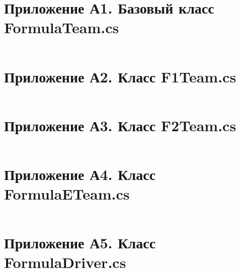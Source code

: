 \documentclass[oneside,a4paper,14pt]{extarticle}
\begin{document}
\newpage

\section*{Приложение А1. Базовый класс FormulaTeam.cs}
\inputminted{csharp}{code/src/Core/FormulaTeam.cs}

\section*{Приложение А2. Класс F1Team.cs}
\inputminted{csharp}{code/src/Core/F1Team.cs}

\section*{Приложение А3. Класс F2Team.cs}
\inputminted{csharp}{code/src/Core/F2Team.cs}

\section*{Приложение А4. Класс FormulaETeam.cs}
\inputminted{csharp}{code/src/Core/FormulaETeam.cs}

\section*{Приложение А5. Класс FormulaDriver.cs}
\inputminted{csharp}{code/src/Core/FormulaDriver.cs}
\end{document}
